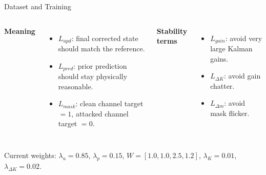 \documentclass[aspectratio=169,11pt]{beamer}
\begin{document}
\begin{frame}{Dataset and Training}
  \begin{columns}[T,onlytextwidth]
    \textbf{Meaning}
    \begin{itemize}
      \item $L_{upd}$: final corrected state should match the reference.
      \item $L_{pred}$: prior prediction should stay physically reasonable.
      \item $L_{mask}$: clean channel target $=1$, attacked channel target $=0$.
    \end{itemize}

    \textbf{Stability terms}
    \begin{itemize}
      \item $L_{gain}$: avoid very large Kalman gains.
      \item $L_{\Delta K}$: avoid gain chatter.
      \item $L_{\Delta m}$: avoid mask flicker.
    \end{itemize}
  \end{columns}

  Current weights: $\lambda_u=0.85$, $\lambda_p=0.15$,
  $W=[1.0,1.0,2.5,1.2]$, $\lambda_K=0.01$,
  $\lambda_{\Delta K}=0.02$.

\end{frame}
\end{document}
